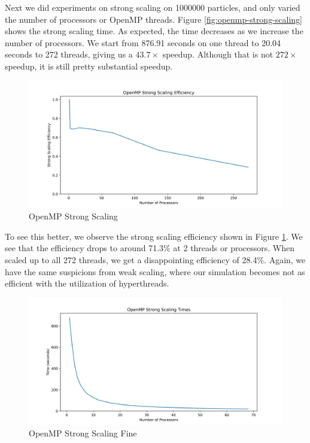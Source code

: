 \documentclass{article}
\begin{document}
Next we did experiments on strong scaling on 1000000 particles, and only varied the number of processors or OpenMP threads. Figure \ref{fig:openmp-strong-scaling} shows the strong scaling time. As expected, the time decreases as we increase the number of processors. We start from 876.91 seconds on one thread to 20.04 seconds to 272 threads, giving us a $43.7\times$ speedup. Although that is not $272\times$ speedup, it is still pretty substantial speedup.

\begin{figure}[H]
\centering
\includegraphics[width=6in]{figures/openmp_strong_scaling_efficiency.png}
\caption{OpenMP Strong Scaling}
\label{fig:openmp-strong-scaling-efficiency}
\end{figure}

To see this better, we observe the strong scaling efficiency shown in Figure \ref{fig:openmp-strong-scaling-efficiency}. We see that the efficiency drops to around 71.3\% at 2 threads or processors. When scaled up to all 272 threads, we get a disappointing efficiency of 28.4\%. Again, we have the same suspicions from weak scaling, where our simulation becomes not as efficient with the utilization of hyperthreads.

\begin{figure}[H]
\centering
\includegraphics[width=6in]{figures/openmp_strong_scaling_times_fine.png}
\caption{OpenMP Strong Scaling Fine}
\label{fig:openmp-strong-scaling-fine}
\end{figure}
\end{document}
